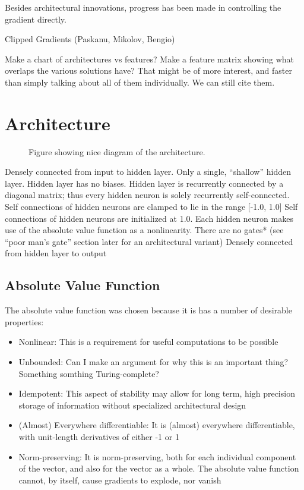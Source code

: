 \documentclass{article}
\begin{document}
Besides architectural innovations, progress has been made in controlling the gradient directly.

Clipped Gradients (Paskanu, Mikolov, Bengio)

Make a chart of architectures vs features?
Make a feature matrix showing what overlaps the various solutions have? That might be of more interest, and faster than simply talking about all of them individually. We can still cite them.

\section{Architecture}
\label{headings}
\begin{figure}
  \centering
  
  \caption{Figure showing nice diagram of the architecture.}
\end{figure}

Densely connected from input to hidden layer.
Only a single, “shallow” hidden layer.
Hidden layer has no biases.
Hidden layer is recurrently connected by a diagonal matrix; thus every hidden neuron is solely recurrently self-connected.
Self connections of hidden neurons are clamped to lie in the range [-1.0, 1.0]
Self connections of hidden neurons are initialized at 1.0.
Each hidden neuron makes use of the absolute value function as a nonlinearity.
There are no gates* (see “poor man’s gate” section later for an architectural variant)
Densely connected from hidden layer to output


\subsection{Absolute Value Function}

The absolute value function was chosen because it is has a number of desirable properties: 

\begin{itemize}
\item Nonlinear: This is a requirement for useful computations to be possible
\item Unbounded: Can I make an argument for why this is an important thing? Something somthing Turing-complete?
\item Idempotent: This aspect of stability may allow for long term, high precision storage of information without specialized architectural design
\item (Almost) Everywhere differentiable: It is (almost) everywhere differentiable, with unit-length derivatives of either -1 or 1
\item Norm-preserving: It is norm-preserving, both for each individual component of the vector, and also for the vector as a whole.
The absolute value function cannot, by itself, cause gradients to explode, nor vanish
\end{itemize}
\end{document}
